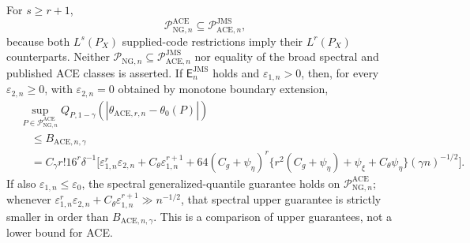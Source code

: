 For \(s\ge r+1\),
\[
 \mathcal P_{\mathrm{NG},n}^{\mathrm{ACE}}
 \subseteq\mathcal P_{\mathrm{ACE},n}^{\mathrm{JMS}},
\]
because both \(L^s(P_X)\) supplied-code restrictions imply their \(L^r(P_X)\) counterparts. Neither \(\mathcal P_{\mathrm{NG},n}\subseteq\mathcal P_{\mathrm{ACE},n}^{\mathrm{JMS}}\) nor equality of the broad spectral and published ACE classes is asserted. If \(\mathsf E_n^{\mathrm{JMS}}\) holds and \(\varepsilon_{1,n}>0\), then, for every \(\varepsilon_{2,n}\ge0\), with \(\varepsilon_{2,n}=0\) obtained by monotone boundary extension,
\[
\begin{aligned}
 &\sup_{P\in\mathcal P_{\mathrm{NG},n}^{\mathrm{ACE}}}
 Q_{P,1-\gamma}(|\widehat\theta_{\mathrm{ACE},r,n}-\theta_0(P)|)\\
 &\quad\le B_{\mathrm{ACE},n,\gamma}\\
 &\quad=C_{\gamma}r!16^r\delta^{-1}
 \Big[\varepsilon_{1,n}^r\varepsilon_{2,n}
 +C_{\theta}\varepsilon_{1,n}^{r+1}
 +64(C_g+\psi_{\eta})^r
 \{r^2(C_g+\psi_{\eta})+\psi_{\xi}+C_{\theta}\psi_{\eta}\}
 (\gamma n)^{-1/2}\Big].
\end{aligned}
\]
If also \(\varepsilon_{1,n}\le\varepsilon_0\), the spectral generalized-quantile guarantee holds on \(\mathcal P_{\mathrm{NG},n}^{\mathrm{ACE}}\); whenever \(\varepsilon_{1,n}^r\varepsilon_{2,n}+C_{\theta}\varepsilon_{1,n}^{r+1}\gg n^{-1/2}\), that spectral upper guarantee is strictly smaller in order than \(B_{\mathrm{ACE},n,\gamma}\). This is a comparison of upper guarantees, not a lower bound for ACE.